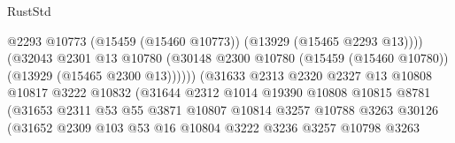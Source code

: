 \begin{lexlean}{RustStd}
\begin{coremodule}
                                              @2293
                                              @10773
                                              (@15459 (@15460 @10773))
                                              (@13929 (@15465 @2293 @13))))
                                          (@32043
                                            @2301
                                            @13
                                            @10780
                                            (@30148
                                              @2300
                                              @10780
                                              (@15459 (@15460 @10780))
                                              (@13929 (@15465 @2300 @13))))))
                                      (@31633
                                        @2313
                                        @2320
                                        @2327
                                        @13
                                        @10808
                                        @10817
                                        @3222
                                        @10832
                                        (@31644
                                          @2312
                                          @1014
                                          @19390
                                          @10808
                                          @10815
                                          @8781
                                          (@31653
                                            @2311
                                            @53
                                            @55
                                            @3871
                                            @10807
                                            @10814
                                            @3257
                                            @10788
                                            @3263
                                            @30126
                                            (@31652
                                              @2309
                                              @103
                                              @53
                                              @16
                                              @10804
                                              @3222
                                              @3236
                                              @3257
                                              @10798
                                              @3263

\end{coremodule}
\end{lexlean}
